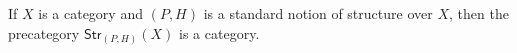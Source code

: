 \documentclass[hott-all.tex]{subfiles}
\begin{document}

\begin{thm}
  If $X$ is a category and $(P,H)$ is a standard notion of structure over $X$, then the precategory $\mathsf{Str}_{(P,H)}(X)$ is a category.
\end{thm}
%
\end{document}
